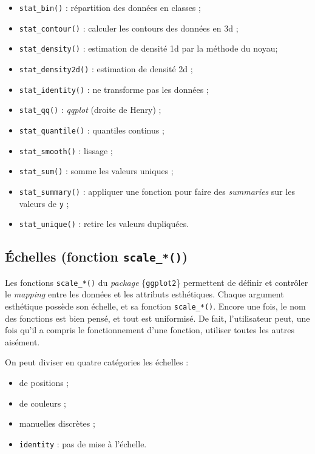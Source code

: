 \documentclass[
  11pt,
]{book}
\providecommand{\tightlist}{%
  \setlength{\itemsep}{0pt}\setlength{\parskip}{0pt}}
\numberwithin{equation}{section}
\numberwithin{countremarque}{section}
\begin{document}
\begin{itemize}
\tightlist
\item
  \texttt{stat\_bin()} : répartition des données en classes ;
\item
  \texttt{stat\_contour()} : calculer les contours des données en 3d ;
\item
  \texttt{stat\_density()} : estimation de densité 1d par la méthode du noyau;
\item
  \texttt{stat\_density2d()} : estimation de densité 2d ;
\item
  \texttt{stat\_identity()} : ne transforme pas les données ;
\item
  \texttt{stat\_qq()} : \emph{qqplot} (droite de Henry) ;
\item
  \texttt{stat\_quantile()} : quantiles continus ;
\item
  \texttt{stat\_smooth()} : lissage ;
\item
  \texttt{stat\_sum()} : somme les valeurs uniques ;
\item
  \texttt{stat\_summary()} : appliquer une fonction pour faire des \emph{summaries} sur les valeurs de \texttt{y} ;
\item
  \texttt{stat\_unique()} : retire les valeurs dupliquées.
\end{itemize}

\hypertarget{graphiques_ggplot_scale}{%
\subsection{\texorpdfstring{Échelles (fonction \texttt{scale\_*()})}{Échelles (fonction scale\_*())}}\label{graphiques_ggplot_scale}}

Les fonctions \texttt{scale\_*()} du \emph{package} \{\texttt{ggplot2}\} permettent de définir et contrôler le \emph{mapping} entre les données et les attributs esthétiques. Chaque argument esthétique possède son échelle, et sa fonction \texttt{scale\_*()}. Encore une fois, le nom des fonctions est bien pensé, et tout est uniformisé. De fait, l'utilisateur peut, une fois qu'il a compris le fonctionnement d'une fonction, utiliser toutes les autres aisément.

On peut diviser en quatre catégories les échelles :

\begin{itemize}
\tightlist
\item
  de positions ;
\item
  de couleurs ;
\item
  manuelles discrètes ;
\item
  \texttt{identity} : pas de mise à l'échelle.
\end{itemize}
\end{document}
